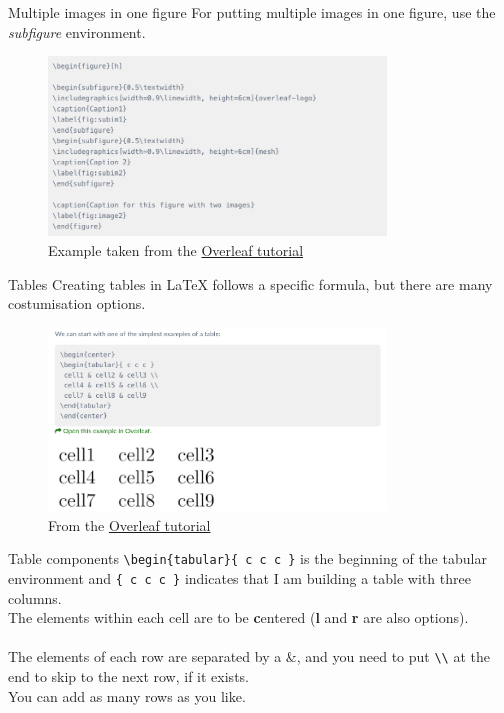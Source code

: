 \documentclass{beamer}
\begin{document}
\begin{frame}[fragile]{Multiple images in one figure}
For putting multiple images in one figure, use the \textit{subfigure} environment.\\
\begin{figure}
    \centering
    \includegraphics[width=0.8\textwidth]{subfigure.png}
    \caption{Example taken from the \href{https://www.overleaf.com/learn/latex/Positioning_images_and_tables\#Multiple_images_in_one_figure}{Overleaf tutorial}}
    \label{fig:subfigure}
\end{figure}
    
\end{frame}

\begin{frame}{Tables}
Creating tables in LaTeX follows a specific formula, but there are many costumisation options.\\
\begin{figure}
    \centering
    \includegraphics[width=0.8\textwidth]{table_simple.png}
    \caption{From the \href{https://www.overleaf.com/learn/latex/Tables}{Overleaf tutorial}}
    \label{fig:table_simple}
\end{figure}
\end{frame}

\begin{frame}[fragile]{Table components}
\verb|\begin{tabular}{ c c c }| is the beginning of the tabular environment and \verb|{ c c c }| indicates that I am building a table with three columns.\\ 
The elements within each cell are to be \textbf{c}entered (\textbf{l} and \textbf{r} are also options).\\~\\
The elements of each row are separated by a \&, and you need to put \verb|\\| at the end to skip to the next row, if it exists.\\
You can add as many rows as you like.
\end{frame}
\end{document}
